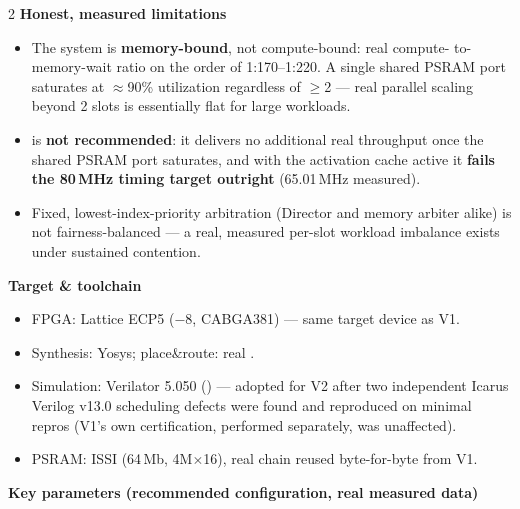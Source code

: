 \begin{multicols}{2}
{\color{fnDark}\large\bfseries Honest, measured limitations}\\[2pt]
{\footnotesize
\begin{itemize}[leftmargin=1.1em]
\item The system is \textbf{memory-bound}, not compute-bound: real compute-
      to-memory-wait ratio on the order of 1:170--1:220. A single shared
      PSRAM port saturates at $\approx$90\% utilization regardless of
      $\ge$2 --- real parallel scaling beyond 2 slots is
      essentially flat for large workloads.
\item {} is \textbf{not recommended}: it delivers no
      additional real throughput once the shared PSRAM port saturates,
      and with the activation cache active it \textbf{fails the 80\,MHz
      timing target outright} (65.01\,MHz measured).
\item Fixed, lowest-index-priority arbitration (Director and memory
      arbiter alike) is not fairness-balanced --- a real, measured
      per-slot workload imbalance exists under sustained contention.
\end{itemize}}

\vspace{4pt}
{\color{fnDark}\large\bfseries Target \& toolchain}\\[2pt]
{\footnotesize
\begin{itemize}[leftmargin=1.1em]
\item FPGA: Lattice ECP5  ($-8$, CABGA381) --- same
      target device as V1.
\item Synthesis: Yosys; place\&route: real .
\item Simulation: Verilator 5.050 () --- adopted
      for V2 after two independent Icarus Verilog v13.0 scheduling
      defects were found and reproduced on minimal repros (V1's own
      certification, performed separately, was unaffected).
\item PSRAM: ISSI  (64\,Mb, 4M$\times$16),
      real chain reused byte-for-byte from V1.
\end{itemize}}
\end{multicols}

\vspace{2pt}
\noindent
{\small\color{fnDark}\bfseries Key parameters (recommended configuration, real measured data)}
\vspace{2pt}

